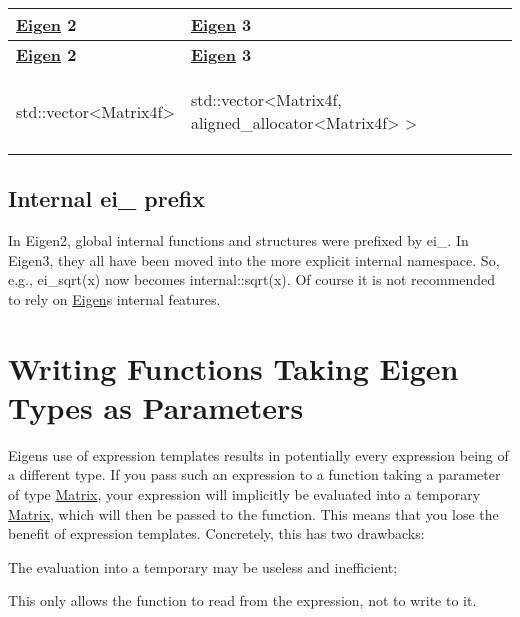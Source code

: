 \tabulinesep=1mm
\begin{longtabu} spread 0pt [c]{*{2}{|X[-1]}|}
\hline
\rowcolor{\tableheadbgcolor}\textbf{ \hyperlink{namespace_eigen}{Eigen} 2}&\textbf{ \hyperlink{namespace_eigen}{Eigen} 3 }\\
\endfirsthead
\hline
\endfoot
\hline
\rowcolor{\tableheadbgcolor}\textbf{ \hyperlink{namespace_eigen}{Eigen} 2}&\textbf{ \hyperlink{namespace_eigen}{Eigen} 3 }\\
\endhead

\begin{DoxyCode}
std::vector<Matrix4f> 
\end{DoxyCode}
  &
\begin{DoxyCode}
std::vector<Matrix4f, aligned\_allocator<Matrix4f> > 
\end{DoxyCode}
   \\
\end{longtabu}
\hypertarget{_eigen2_to_eigen3_eiPrefix}{}\subsection{Internal ei\+\_\+ prefix}\label{_eigen2_to_eigen3_eiPrefix}
In Eigen2, global internal functions and structures were prefixed by {\ttfamily ei\+\_\+}. In Eigen3, they all have been moved into the more explicit {\ttfamily internal} namespace. So, e.\+g., {\ttfamily ei\+\_\+sqrt(x)} now becomes {\ttfamily internal\+::sqrt(x)}. Of course it is not recommended to rely on \hyperlink{namespace_eigen}{Eigen}\textquotesingle{}s internal features. \hypertarget{TopicFunctionTakingEigenTypes}{}\section{Writing Functions Taking Eigen Types as Parameters}\label{TopicFunctionTakingEigenTypes}
Eigen\textquotesingle{}s use of expression templates results in potentially every expression being of a different type. If you pass such an expression to a function taking a parameter of type \hyperlink{group___core___module_class_eigen_1_1_matrix}{Matrix}, your expression will implicitly be evaluated into a temporary \hyperlink{group___core___module_class_eigen_1_1_matrix}{Matrix}, which will then be passed to the function. This means that you lose the benefit of expression templates. Concretely, this has two drawbacks\+: \begin{DoxyItemize}
\item The evaluation into a temporary may be useless and inefficient; \item This only allows the function to read from the expression, not to write to it.\end{DoxyItemize}
